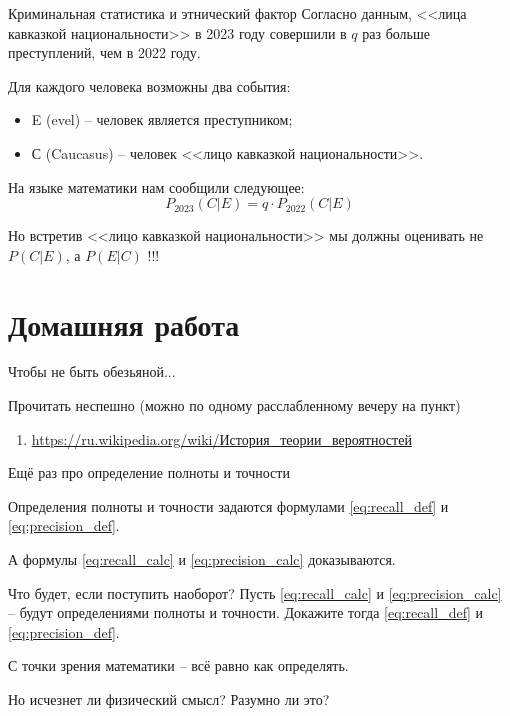 \begin{frame}[fragile,t]{Криминальная статистика и этнический фактор}
\small
Согласно данным, <<лица кавказкой национальности>> в 2023 году совершили 
в $q$ раз больше преступлений, чем в 2022 году.

	
Для каждого человека возможны два события:
\begin{itemize}
	\item E (evel) -- человек является преступником;
	\item С (Caucasus) -- человек <<лицо кавказкой национальности>>.
\end{itemize}

На языке математики нам сообщили следующее:
\begin{equation}
P_{2023}(C|E) = q \cdot P_{2022}(C|E)
\end{equation}

Но встретив <<лицо кавказкой национальности>> мы должны оценивать 
не $P(C|E)$, а $P(E|C)$ !!!

	
\end{frame}


\section{Домашняя работа}

\begin{frame}{Чтобы не быть обезьяной...}
	
Прочитать неспешно
(можно по одному расслабленному вечеру на пункт)
\begin{enumerate}
	\item \url{https://ru.wikipedia.org/wiki/История_теории_вероятностей}
\end{enumerate}

\end{frame}



\begin{frame}{Ещё раз про определение полноты и точности}
	
	Определения полноты и точности задаются формулами  \eqref{eq:recall_def} и \eqref{eq:precision_def}.
	
	А формулы \eqref{eq:recall_calc} и \eqref{eq:precision_calc}
	доказываются.
	
	Что будет, если поступить наоборот? 
	Пусть \eqref{eq:recall_calc} и \eqref{eq:precision_calc} -- будут определениями
	полноты и точности. 
	Докажите тогда  \eqref{eq:recall_def} и \eqref{eq:precision_def}.
	
	С точки зрения математики -- всё равно как определять.
	
	Но исчезнет ли физический смысл? Разумно ли это?
	
\end{frame}


